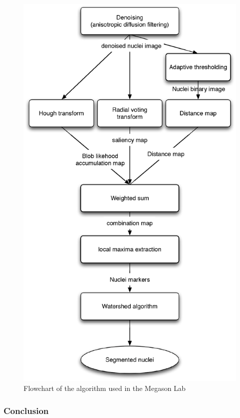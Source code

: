 \begin{figure}[h]
\begin{center}
\leavevmode
\includegraphics[height=0.75\textheight]{pictures/kishoreFlowchart}
\end{center}
\caption{Flowchart of the algorithm used in the Megason Lab}
\label{fig:kishoreFlowchart}
\end{figure}
\clearpage


\subsubsection*{Conclusion}


